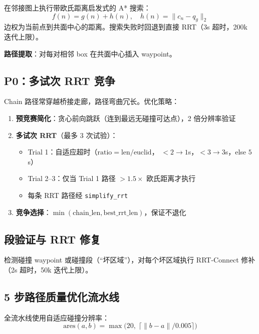 \documentclass[11pt,a4paper]{article}
\begin{document}
在邻接图上执行带欧氏距离启发式的 A* 搜索：
\begin{equation}
f(n) = g(n) + h(n), \quad h(n) = \|c_n - q_g\|_2
\end{equation}
边权为当前点到共面中心的距离。搜索失败时回退到直接 RRT（3s 超时，200k 迭代上限）。

\textbf{路径提取}：对每对相邻 box 在共面中心插入 waypoint。

\subsection{P0：多试次 RRT 竞争}

Chain 路径常穿越桥接走廊，路径弯曲冗长。优化策略：

\begin{enumerate}[nosep]
  \item \textbf{预竞赛简化}：贪心前向跳跃（连到最远无碰撞可达点），2 倍分辨率验证
  \item \textbf{多试次 RRT}（最多 3 次试验）：
  \begin{itemize}[nosep]
    \item Trial 1：自适应超时（$\text{ratio} = \text{len} / \text{euclid}$，
          $<2 \to 1$s，$<3 \to 3$s，else $5$s）
    \item Trial 2--3：仅当 Trial 1 路径 $> 1.5 \times$ 欧氏距离才执行
    \item 每条 RRT 路径经 \texttt{simplify\_rrt}
  \end{itemize}
  \item \textbf{竞争选择}：$\min(\text{chain\_len}, \text{best\_rrt\_len})$，保证不退化
\end{enumerate}

\subsection{段验证与 RRT 修复}

检测碰撞 waypoint 或碰撞段（``坏区域''），对每个坏区域执行 RRT-Connect 修补
（2s 超时，50k 迭代上限）。

\subsection{5 步路径质量优化流水线}

全流水线使用自适应碰撞分辨率：
\begin{equation}
\mathrm{ares}(a,b) = \max\!\big(20,\; \lceil \|b - a\| / 0.005 \rceil\big)
\end{equation}
\end{document}
